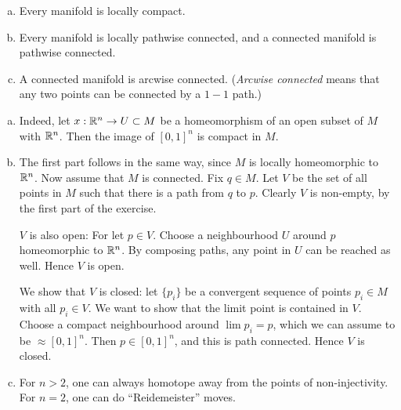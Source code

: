 \documentclass[11pt, english]{article}
\begin{document}
\begin{exc}[Exercise 3]
  \begin{enumerate}[a)]
  \item Every manifold is locally compact.
\item Every manifold is locally pathwise connected, and a connected manifold is pathwise connected.
\item A connected manifold is arcwise connected. (\emph{Arcwise connected} means that any two points can be connected by a $1-1$ path.)
  \end{enumerate}
\end{exc}

\begin{sol}
  \begin{enumerate}[a)]
  \item Indeed, let $x:\mathbb{R}^n \to U \subset M$ be a homeomorphism of an open subset of $M$ with $\mathbb{R}^n$. Then the image of $[0,1]^n$ is compact in $M$. 
\item The first part follows in the same way, since $M$ is locally homeomorphic to $\mathbb{R}^n$. Now assume that $M$ is connected. Fix $q \in M$. Let $V$ be the set of all points in $M$ such that there is a path from $q$ to $p$. Clearly $V$ is non-empty, by the first part of the exercise.

$V$ is also open: For let $p \in V$. Choose a neighbourhood $U$ around $p$ homeomorphic to $\mathbb{R}^n$. By composing paths, any point in $U$ can be reached as well. Hence $V$ is open.

We show that $V$ is closed: let $\{p_i \}$ be a convergent sequence of points $p_i \in M$ with all $p_i \in V$. We want to show that the limit point is contained in $V$. Choose a compact neighbourhood around $\lim p_i = p$, which we can assume to be $\approx [0,1]^n$. Then $p \in [0,1]^n$, and this is path connected. Hence $V$ is closed.
\item For $n > 2$, one can always homotope away from the points of non-injectivity. For $n=2$, one can do ``Reidemeister'' moves.
  \end{enumerate}
\end{sol}
\end{document}
